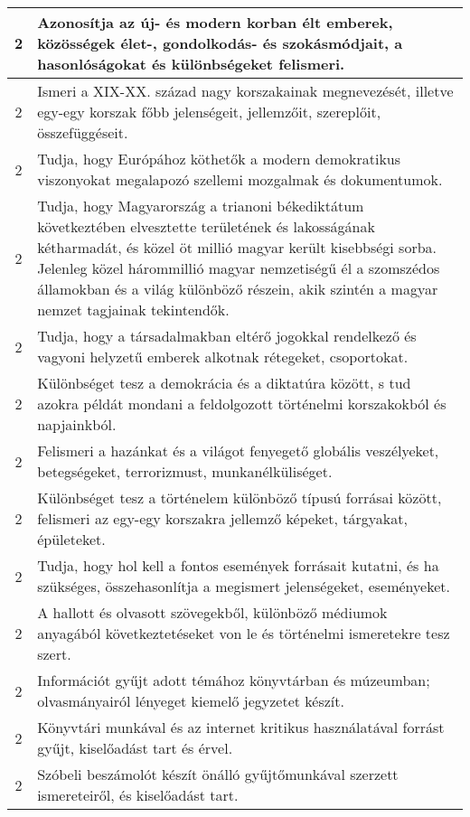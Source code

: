 \begin{longtable}{c | p{12cm} }
                                
                                          2 &  Azonosítja az új- és modern korban élt emberek, közösségek élet-, gondolkodás- és szokásmódjait, a hasonlóságokat és különbségeket felismeri.
 \\ \hline
                                          2 &  Ismeri a XIX-XX. század nagy korszakainak megnevezését, illetve egy-egy korszak főbb jelenségeit, jellemzőit, szereplőit, összefüggéseit. \\ \hline
                                          2 &  Tudja, hogy Európához köthetők a modern demokratikus viszonyokat megalapozó szellemi mozgalmak és dokumentumok. \\ \hline
                                          2 &  Tudja, hogy Magyarország a trianoni békediktátum következtében elvesztette területének és lakosságának kétharmadát, és közel öt millió magyar került kisebbségi sorba. Jelenleg közel hárommillió magyar nemzetiségű él a szomszédos államokban és a világ különböző részein, akik szintén a magyar nemzet tagjainak tekintendők. \\ \hline
                                          2 &  Tudja, hogy a társadalmakban eltérő jogokkal rendelkező és vagyoni helyzetű emberek alkotnak rétegeket, csoportokat. \\ \hline
                                          2 &  Különbséget tesz a demokrácia és a diktatúra között, s tud azokra példát mondani a feldolgozott történelmi korszakokból és napjainkból. \\ \hline
                                          2 &  Felismeri a hazánkat és a világot fenyegető globális veszélyeket, betegségeket, terrorizmust, munkanélküliséget. \\ \hline
                                          2 &  Különbséget tesz a történelem különböző típusú forrásai között, felismeri az egy-egy korszakra jellemző képeket, tárgyakat, épületeket. \\ \hline
                                          2 &  Tudja, hogy hol kell a fontos események forrásait kutatni, és ha szükséges, összehasonlítja a megismert jelenségeket, eseményeket. \\ \hline
                                          2 &  A hallott és olvasott szövegekből, különböző médiumok anyagából következtetéseket von le és történelmi ismeretekre tesz szert. \\ \hline
                                          2 &  Információt gyűjt adott témához könyvtárban és múzeumban; olvasmányairól lényeget kiemelő jegyzetet készít. \\ \hline
                                          2 &  Könyvtári munkával és az internet kritikus használatával forrást gyűjt, kiselőadást tart és érvel. \\ \hline
                                          2 &  Szóbeli beszámolót készít önálló gyűjtőmunkával szerzett ismereteiről, és kiselőadást tart. \\ \hline
                                      

\end{longtable}
